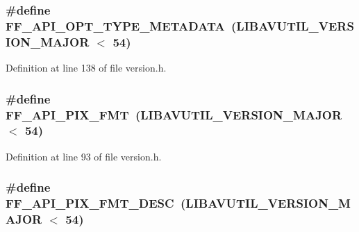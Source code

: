\subsubsection[{\texorpdfstring{F\+F\+\_\+\+A\+P\+I\+\_\+\+O\+P\+T\+\_\+\+T\+Y\+P\+E\+\_\+\+M\+E\+T\+A\+D\+A\+TA}{FF_API_OPT_TYPE_METADATA}}]{\setlength{\rightskip}{0pt plus 5cm}\#define F\+F\+\_\+\+A\+P\+I\+\_\+\+O\+P\+T\+\_\+\+T\+Y\+P\+E\+\_\+\+M\+E\+T\+A\+D\+A\+TA~({\bf L\+I\+B\+A\+V\+U\+T\+I\+L\+\_\+\+V\+E\+R\+S\+I\+O\+N\+\_\+\+M\+A\+J\+OR} $<$ 54)}\hypertarget{group__depr__guards_ga159400810452c45133a20bd0ba96da94}{}\label{group__depr__guards_ga159400810452c45133a20bd0ba96da94}


Definition at line 138 of file version.\+h.

\subsubsection[{\texorpdfstring{F\+F\+\_\+\+A\+P\+I\+\_\+\+P\+I\+X\+\_\+\+F\+MT}{FF_API_PIX_FMT}}]{\setlength{\rightskip}{0pt plus 5cm}\#define F\+F\+\_\+\+A\+P\+I\+\_\+\+P\+I\+X\+\_\+\+F\+MT~({\bf L\+I\+B\+A\+V\+U\+T\+I\+L\+\_\+\+V\+E\+R\+S\+I\+O\+N\+\_\+\+M\+A\+J\+OR} $<$ 54)}\hypertarget{group__depr__guards_ga1c0f94e3a9bcb00383e24fb588952756}{}\label{group__depr__guards_ga1c0f94e3a9bcb00383e24fb588952756}


Definition at line 93 of file version.\+h.

\subsubsection[{\texorpdfstring{F\+F\+\_\+\+A\+P\+I\+\_\+\+P\+I\+X\+\_\+\+F\+M\+T\+\_\+\+D\+E\+SC}{FF_API_PIX_FMT_DESC}}]{\setlength{\rightskip}{0pt plus 5cm}\#define F\+F\+\_\+\+A\+P\+I\+\_\+\+P\+I\+X\+\_\+\+F\+M\+T\+\_\+\+D\+E\+SC~({\bf L\+I\+B\+A\+V\+U\+T\+I\+L\+\_\+\+V\+E\+R\+S\+I\+O\+N\+\_\+\+M\+A\+J\+OR} $<$ 54)}\hypertarget{group__depr__guards_ga827d870e3fd7689100d91d927b616365}{}\label{group__depr__guards_ga827d870e3fd7689100d91d927b616365}



